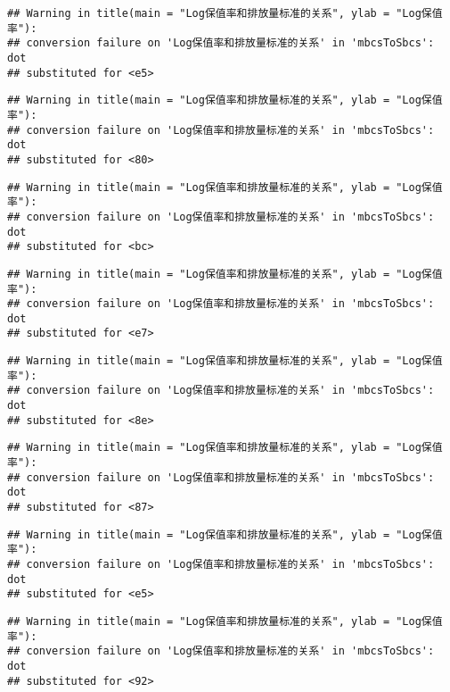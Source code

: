 \documentclass[]{article}
\begin{document}
\begin{verbatim}
## Warning in title(main = "Log保值率和排放量标准的关系", ylab = "Log保值率"):
## conversion failure on 'Log保值率和排放量标准的关系' in 'mbcsToSbcs': dot
## substituted for <e5>
\end{verbatim}

\begin{verbatim}
## Warning in title(main = "Log保值率和排放量标准的关系", ylab = "Log保值率"):
## conversion failure on 'Log保值率和排放量标准的关系' in 'mbcsToSbcs': dot
## substituted for <80>
\end{verbatim}

\begin{verbatim}
## Warning in title(main = "Log保值率和排放量标准的关系", ylab = "Log保值率"):
## conversion failure on 'Log保值率和排放量标准的关系' in 'mbcsToSbcs': dot
## substituted for <bc>
\end{verbatim}

\begin{verbatim}
## Warning in title(main = "Log保值率和排放量标准的关系", ylab = "Log保值率"):
## conversion failure on 'Log保值率和排放量标准的关系' in 'mbcsToSbcs': dot
## substituted for <e7>
\end{verbatim}

\begin{verbatim}
## Warning in title(main = "Log保值率和排放量标准的关系", ylab = "Log保值率"):
## conversion failure on 'Log保值率和排放量标准的关系' in 'mbcsToSbcs': dot
## substituted for <8e>
\end{verbatim}

\begin{verbatim}
## Warning in title(main = "Log保值率和排放量标准的关系", ylab = "Log保值率"):
## conversion failure on 'Log保值率和排放量标准的关系' in 'mbcsToSbcs': dot
## substituted for <87>
\end{verbatim}

\begin{verbatim}
## Warning in title(main = "Log保值率和排放量标准的关系", ylab = "Log保值率"):
## conversion failure on 'Log保值率和排放量标准的关系' in 'mbcsToSbcs': dot
## substituted for <e5>
\end{verbatim}

\begin{verbatim}
## Warning in title(main = "Log保值率和排放量标准的关系", ylab = "Log保值率"):
## conversion failure on 'Log保值率和排放量标准的关系' in 'mbcsToSbcs': dot
## substituted for <92>
\end{verbatim}
\end{document}
